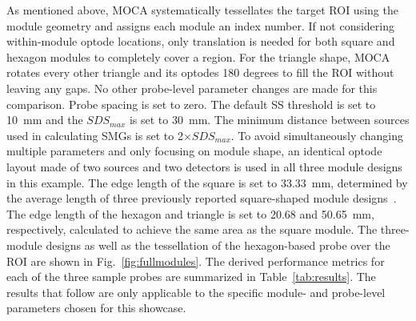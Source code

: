 As mentioned above, \ac{MOCA} systematically tessellates the target \ac{ROI} using the module geometry and assigns each module an index number. If not considering within-module optode locations, only translation is needed for both square and hexagon modules to completely cover a region. For the triangle shape, \ac{MOCA} rotates every other triangle and its optodes 180 degrees to fill the \ac{ROI} without leaving any gaps. No other probe-level parameter changes are made for this comparison. Probe spacing is set to zero. The default SS threshold is set to 10~mm and the $SDS_{max}$ is set to 30~mm. The minimum distance between sources used in calculating SMGs is set to 2$\times SDS_{max}$. To avoid simultaneously changing multiple parameters and only focusing on module shape, an identical optode layout made of two sources and two detectors is used in all three module designs in this example. The edge length of the square is set to 33.33~mm, determined by the average length of three previously reported square-shaped module designs~\cite{Chitnis2016, Bci2017, Zimmermann2013}. The edge length of the hexagon and triangle is set to 20.68 and 50.65~mm, respectively, calculated to achieve the same area as the square module. The three-module designs as well as the tessellation of the hexagon-based probe over the \ac{ROI} are shown in Fig.~\ref{fig:fullmodules}. The derived performance metrics for each of the three sample probes are summarized in Table~\ref{tab:results}. The results that follow are only applicable to the specific module- and probe-level parameters chosen for this showcase.

